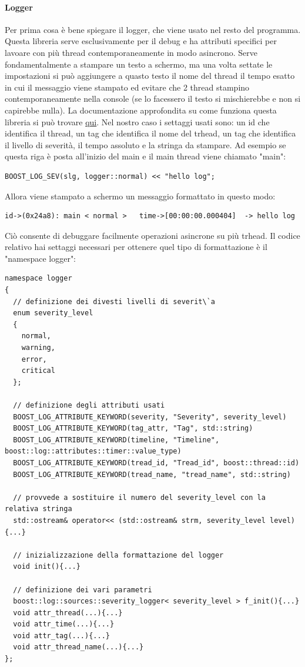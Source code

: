 \documentclass[10pt,a4paper]{article}
\begin{document}
\paragraph{Logger}
Per prima cosa \`e bene spiegare il logger, che viene usato nel resto del programma. Questa libreria serve esclusivamente per il debug e ha attributi specifici per lavoare con pi\`u thread contemporaneamente in modo asincrono. Serve fondamentalmente a stampare un testo a schermo, ma una volta settate le impostazioni si pu\`o aggiungere a quasto testo il nome del thread il tempo esatto in cui il messaggio viene stampato ed evitare che 2 thread stampino contemporaneamente nella console (se lo facessero il testo si mischierebbe e non si capirebbe nulla). La documentazione approfondita su come funziona questa libreria si pu\`o trovare \href{https://www.boost.org/doc/libs/1_69_0/libs/log/doc/html/index.html#log.moti}{qui}. Nel nostro caso i settaggi usati sono: un id che identifica il thread, un tag che identifica il nome del trhead, un tag che identifica il livello di severit\`a, il tempo assoluto e la stringa da stampare. Ad esempio se questa riga \`e posta all'inizio del main e il main thread viene chiamato "main":
%
\begin{lstlisting}[style=mycpp, caption=librerie usate, captionpos=b]
BOOST_LOG_SEV(slg, logger::normal) << "hello log";
\end{lstlisting}
%
Allora viene stampato a schermo un messaggio formattato in questo modo:
%
\begin{lstlisting}[style=myoutput, caption=librerie usate, captionpos=b]
id->(0x24a8): main < normal >   time->[00:00:00.000404]  -> hello log
\end{lstlisting}
%
Ci\`o consente di debuggare facilmente operazioni asincrone su pi\`u trhead.
Il codice relativo hai settaggi necessari per ottenere quel tipo di formattazione \`e il "namespace logger":
\begin{lstlisting}[style=mycpp, caption=librerie usate, captionpos=b]
namespace logger
{
  // definizione dei divesti livelli di severit\`a
  enum severity_level
  {
    normal,
    warning,
    error,
    critical
  };
  
  // definizione degli attributi usati
  BOOST_LOG_ATTRIBUTE_KEYWORD(severity, "Severity", severity_level)
  BOOST_LOG_ATTRIBUTE_KEYWORD(tag_attr, "Tag", std::string)
  BOOST_LOG_ATTRIBUTE_KEYWORD(timeline, "Timeline", boost::log::attributes::timer::value_type)
  BOOST_LOG_ATTRIBUTE_KEYWORD(tread_id, "Tread_id", boost::thread::id)
  BOOST_LOG_ATTRIBUTE_KEYWORD(tread_name, "tread_name", std::string)

  // provvede a sostituire il numero del severity_level con la relativa stringa
  std::ostream& operator<< (std::ostream& strm, severity_level level){...}

  // inizializzazione della formattazione del logger
  void init(){...}

  // definizione dei vari parametri
  boost::log::sources::severity_logger< severity_level > f_init(){...}
  void attr_thread(...){...}
  void attr_time(...){...}
  void attr_tag(...){...}
  void attr_thread_name(...){...}
};
\end{lstlisting}
\end{document}
